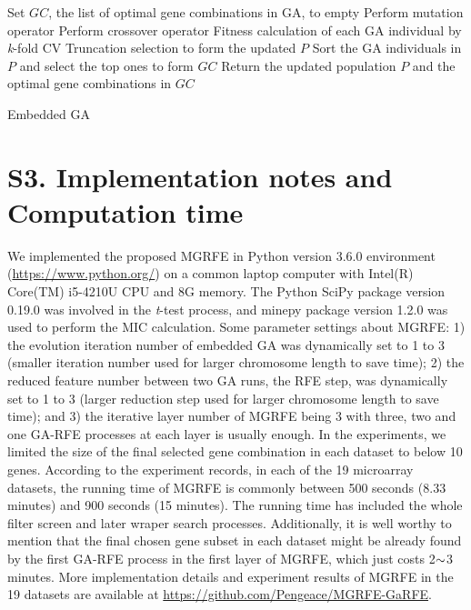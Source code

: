 \documentclass[10pt,journal,compsoc]{IEEEtran}
\begin{document}
	\begin{algorithm}
		\text{}
		Set $GC$, the list of optimal gene combinations in GA, to empty\;
		{
			Perform mutation operator\;
			Perform crossover operator\;
			Fitness calculation of each GA individual by \textit{k}-fold CV\;
			Truncation selection to form the updated $P$\;
		}
		Sort the GA individuals in $P$ and select the top ones to form $GC$\;
		Return the updated population $P$ and the optimal gene combinations in $GC$\;
		\caption{Embedded GA}\label{Algo:GA}
	\end{algorithm}
	
	
	\section*{S3. Implementation notes and Computation time}

	We implemented the proposed MGRFE in Python version 3.6.0 environment (\url{https://www.python.org/}) on a common laptop computer with Intel(R) Core(TM) i5-4210U CPU and 8G memory. The Python SciPy package version 0.19.0 \cite{RN441} was involved in the \textit{t}-test process, and minepy package version 1.2.0 \cite{RN440} was used to perform the MIC calculation. Some parameter settings about MGRFE: 1) the evolution iteration number of embedded GA was dynamically set to 1 to 3 (smaller iteration number used for larger chromosome length to save time); 2) the reduced feature number between two GA runs, the RFE step, was dynamically set to 1 to 3 (larger reduction step used for larger chromosome length to save time); and 3) the iterative layer number of MGRFE being 3 with three, two and one GA-RFE processes at each layer is usually enough. In the experiments, we limited the size of the final selected gene combination in each dataset to below 10 genes. According to the experiment records, in each of the 19 microarray datasets, the running time of MGRFE is commonly between 500 seconds (8.33 minutes) and 900 seconds (15 minutes). The running time has included the whole filter screen and later wraper search processes. Additionally, it is well worthy to mention that the final chosen gene subset in each dataset might be already found by the first GA-RFE process in the first layer of MGRFE, which just costs 2\(\scriptsize{\sim}\)3 minutes. More implementation details and experiment results of MGRFE in the 19 datasets are available at \url{https://github.com/Pengeace/MGRFE-GaRFE}.
	
\end{document}
